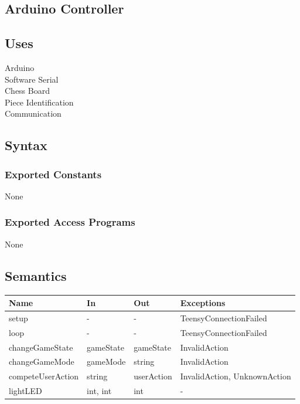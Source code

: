 \documentclass[12pt, titlepage]{article}
\begin{document}
\subsection{Arduino Controller}

\subsection{Uses}
Arduino\\
Software Serial\\
Chess Board\\
Piece Identification\\
Communication\\

\subsection{Syntax}

\subsubsection{Exported Constants}{
  None
}

\subsubsection{Exported Access Programs}
None

\subsection{Semantics}
{
  \begin{center}
  \begin{tabular}{p{4cm} p{3cm} p{3cm} p{4cm}}
  \hline
  \textbf{Name} & \textbf{In} & \textbf{Out} & \textbf{Exceptions} \\
  \hline
  setup & - & - & TeensyConnectionFailed \\
  \midrule
  loop & - & - & TeensyConnectionFailed \\
  \midrule
  changeGameState & gameState & gameState & InvalidAction \\
  \midrule
  changeGameMode & gameMode & string & InvalidAction \\
  \midrule
  competeUserAction & string & userAction & InvalidAction, UnknownAction \\
  \midrule
  lightLED & {int, int} & int & - \\
  \hline
  \end{tabular}
  \end{center}
}
\end{document}
